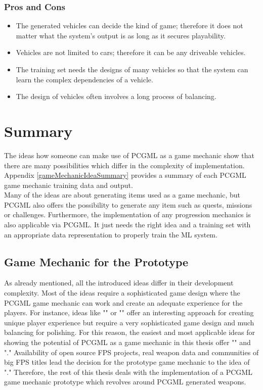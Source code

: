 \documentclass[MGS,Master,english]{twbook}%
\begin{document}
\subsubsection{Pros and Cons}
\begin{itemize}
	\item The generated vehicles can decide the kind of game; therefore it does not matter what the system's output is as long as it secures playability.
	\item Vehicles are not limited to cars; therefore it can be any driveable vehicles.
	\item The training set needs the designs of many vehicles so that the system can learn the complex dependencies of a vehicle.
	\item The design of vehicles often involves a long process of balancing.
\end{itemize}

\section{Summary}
The ideas how someone can make use of PCGML as a game mechanic show that there are many possibilities which differ in the complexity of implementation. Appendix \ref{gameMechanicIdeaSummary} provides a summary of each PCGML game mechanic training data and output.\\
Many of the ideas are about generating items used as a game mechanic, but PCGML also offers the possibility to generate any item such as quests, missions or challenges. Furthermore, the implementation of any progression mechanics is also applicable via PCGML. It just needs the right idea and a training set with an appropriate data representation to properly train the ML system.

\subsection{Game Mechanic for the Prototype}
As already mentioned, all the introduced ideas differ in their development complexity. Most of the ideas require a sophisticated game design where the PCGML game mechanic can work and create an adequate experience for the players. For instance, ideas like "" or "" offer an interesting approach for creating unique player experience but require a very sophisticated game design and much balancing for polishing. For this reason, the easiest and most applicable ideas for showing the potential of PCGML as a game mechanic in this thesis offer "" and "." Availability of open source FPS projects, real weapon data and communities of big FPS titles lead the decision for the prototype game mechanic to the idea of "." Therefore, the rest of this thesis deals with the implementation of a PCGML game mechanic prototype which revolves around PCGML generated weapons.
\end{document}
